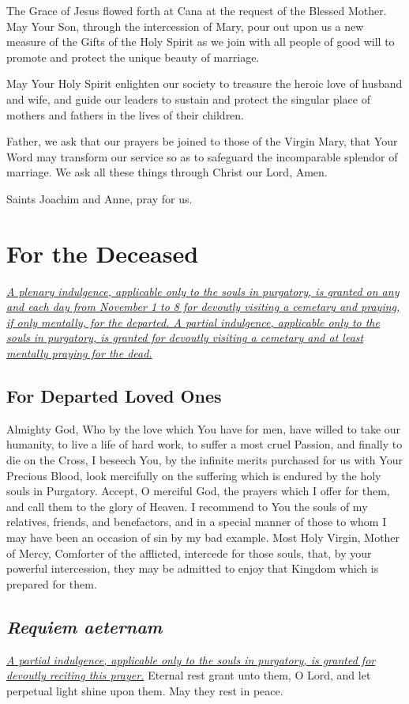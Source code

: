 \documentclass[12pt]{article}
\newcommand{\prayersection}[1]{\section{#1}}
\newcommand{\prayertitle}[1]{\subsection{#1}}
\newcommand{\emphasis}[1]{\emph{#1}}
\newcommand{\emphasis}[1]{\textsl{#1}}
\newcommand{\foreign}[1]{\emphasis{#1}}
\newcommand{\note}[1]{{\small{\emphasis{#1}}}\newline}
\newcommand{\linkednote}[2]{\hyperlink{#1}{\note{#2}}}
\begin{document}
The Grace of Jesus flowed forth at Cana at the request of the Blessed Mother.
May Your Son, through the intercession of Mary, pour out upon us a new measure of the Gifts of the Holy Spirit as we join with all people of good will to promote and protect the unique beauty of marriage.

May Your Holy Spirit enlighten our society to treasure the heroic love of husband and wife, and guide our leaders to sustain and protect
the singular place of mothers and fathers in the lives of their children.

Father, we ask that our prayers be joined to those of the Virgin Mary, that Your Word may transform our service so as to safeguard the incomparable splendor of marriage.
We ask all these things through Christ our Lord,
Amen.

Saints Joachim and Anne, pray for us.

\newpage

\prayersection{For the Deceased}
\linkednote{grant29}{A plenary indulgence, applicable only to the souls in purgatory, is granted on any and each day from November 1 to 8 for devoutly visiting a cemetary and praying, if only mentally, for the departed.
A partial indulgence, applicable only to the souls in purgatory, is granted for devoutly visiting a cemetary and at least mentally praying for the dead.}
\prayertitle{For Departed Loved Ones}
Almighty God, Who by the love which You have for men, have willed to take our humanity, to live a life of hard work, to suffer a most cruel Passion, and finally to die on the Cross, I beseech You, by the infinite merits purchased for us with Your Precious Blood, look mercifully on the suffering  which is endured by the holy souls in Purgatory. 
Accept, O merciful God, the prayers which I offer for them, and call them to the glory of Heaven. 
I recommend to You the souls of my relatives, friends, and benefactors, and in a special manner of those to whom I may have been an occasion of sin by my bad example. 
Most Holy Virgin, Mother of Mercy, Comforter of the afflicted, intercede for those souls, that, by your powerful intercession, they may be admitted to enjoy that Kingdom which is prepared for them.

\prayertitle{\foreign{Requiem aeternam}}
\linkednote{grant29}{A partial indulgence, applicable only to the souls in purgatory, is granted for devoutly reciting this prayer.}
Eternal rest grant unto them, O Lord, and let perpetual light shine upon them.
May they rest in peace.
\end{document}

